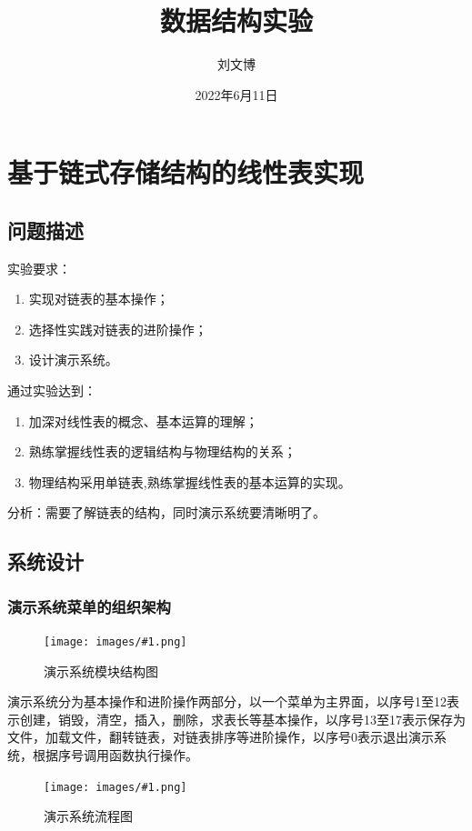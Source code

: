 \documentclass[supercite]{Experimental_Report}
\title{数据结构实验}
\author{刘文博}
\date{2022年6月11日}
\newcommand{\cfig}[3]{
	\begin{figure}[htb]
		\centering
		\texttt{[image: images/\#1.png]}
		\caption{#3}
		\label{fig:#1}
	\end{figure}
}
\theoremstyle{definition}
\begin{document}
		
\maketitle

\clearpage


\tableofcontents[level=2]

\clearpage

		
		
\section{基于链式存储结构的线性表实现}

\subsection{问题描述}
\noindent 实验要求：
\begin{enumerate}
	\item 实现对链表的基本操作；
	\item 选择性实践对链表的进阶操作；
	\item 设计演示系统。
\end{enumerate}
通过实验达到：
\begin{enumerate}
	\item 加深对线性表的概念、基本运算的理解；
	\item 熟练掌握线性表的逻辑结构与物理结构的关系；
	\item 物理结构采用单链表,熟练掌握线性表的基本运算的实现。
\end{enumerate}
分析：需要了解链表的结构，同时演示系统要清晰明了。

		\subsection{系统设计}

\subsubsection{演示系统菜单的组织架构}
\cfig{2.1}{0.6}{演示系统模块结构图}
\newpage
\quad 演示系统分为基本操作和进阶操作两部分，以一个菜单为主界面，以序号1至12表示创建，销毁，清空，插入，删除，求表长等基本操作，以序号13至17表示保存为文件，加载文件，翻转链表，对链表排序等进阶操作，以序号0表示退出演示系统，根据序号调用函数执行操作。
\cfig{2.2}{0.6}{演示系统流程图}
\end{document}
